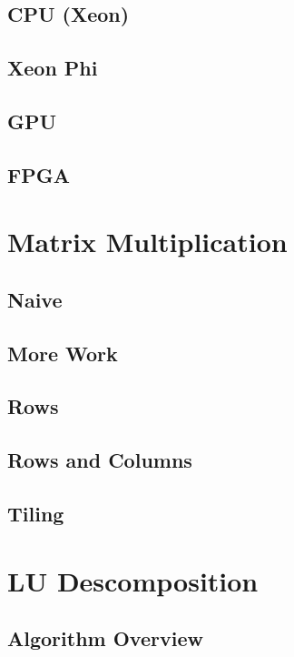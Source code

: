 \documentclass[fleqn,10pt,onecolumn]{ipcc} %
\begin{document}
\subsection{CPU (Xeon)}
\label{sec:cpu}

\subsection{Xeon Phi}
\label{sec:phi}

\subsection{GPU}

\subsection{FPGA}

\section{Matrix Multiplication}

\subsection{Naive}
\label{sec:naive}

\subsection{More Work}
\label{sec:moreWork}

\subsection{Rows}
\label{sec:rows}

\subsection{Rows and Columns}
\label{sec:rowscols}

\subsection{Tiling}
\label{sec:tiling}

\section{LU Descomposition}

\subsection{Algorithm Overview}

\end{document}
